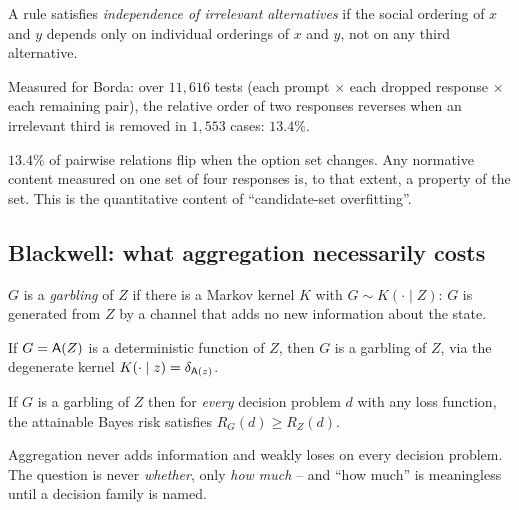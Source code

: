 \begin{definition}[IIA]
A rule satisfies \emph{independence of irrelevant alternatives} if the social
ordering of $x$ and $y$ depends only on individual orderings of $x$ and $y$, not
on any third alternative.
\end{definition}

Measured for Borda: over $11{,}616$ tests (each prompt $\times$ each dropped
response $\times$ each remaining pair), the relative order of two responses
reverses when an irrelevant third is removed in $1{,}553$ cases:
$\mathbf{13.4\%}$.

\begin{corollary}
\label{cor:iia}
$13.4\%$ of pairwise relations flip when the option set changes. Any normative
content measured on one set of four responses is, to that extent, a property of
the set. This is the quantitative content of ``candidate-set overfitting''.
\end{corollary}

\subsection{Blackwell: what aggregation necessarily costs}

\begin{definition}[Garbling]
$G$ is a \emph{garbling} of $Z$ if there is a Markov kernel $K$ with
$G \sim K(\cdot \mid Z)$: $G$ is generated from $Z$ by a channel that adds no new
information about the state.
\end{definition}

\begin{lemma}
\label{lem:garble}
If $G = \mathsf{A}(Z)$ is a deterministic function of $Z$, then $G$ is a garbling of
$Z$, via the degenerate kernel $K(\cdot\mid z) = \delta_{\mathsf{A}(z)}$.
\end{lemma}

\begin{theorem}
\label{thm:garble}
If $G$ is a garbling of $Z$ then for \emph{every} decision problem $d$ with any
loss function, the attainable Bayes risk satisfies $R_G(d) \ge R_Z(d)$.
\end{theorem}

\begin{corollary}
Aggregation never adds information and weakly loses on every decision problem.
The question is never \emph{whether}, only \emph{how much} -- and ``how much'' is
meaningless until a decision family is named.
\end{corollary}

